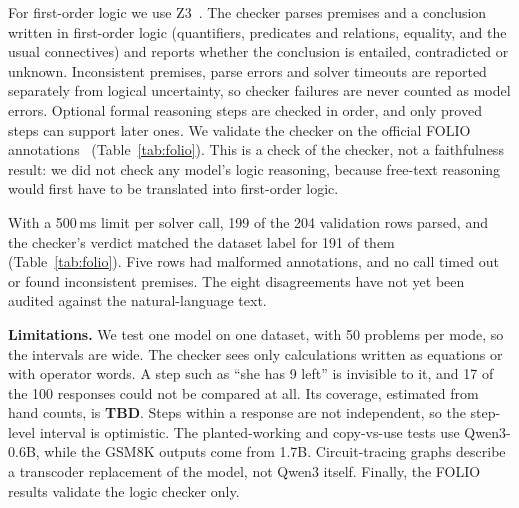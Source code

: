 For first-order logic we use Z3~\cite{demoura2008}. The checker parses premises and a
conclusion written in first-order logic (quantifiers, predicates and relations,
equality, and the usual connectives) and reports whether the conclusion is entailed,
contradicted or unknown. Inconsistent premises, parse errors and solver timeouts are
reported separately from logical uncertainty, so checker failures are never counted
as model errors. Optional formal reasoning steps are checked in order, and only proved
steps can support later ones. We validate the checker on the official FOLIO
annotations~\cite{han2024folio} (Table~\ref{tab:folio}). This is a check of the
checker, not a faithfulness result: we did not check any model's logic reasoning,
because free-text reasoning would first have to be translated into first-order logic.

With a 500\,ms limit per solver call, 199 of the 204 validation rows parsed, and the
checker's verdict matched the dataset label for 191 of them (Table~\ref{tab:folio}).
Five rows had malformed annotations, and no call timed out or found inconsistent
premises. The eight disagreements have not yet been audited against the
natural-language text.

\textbf{Limitations.} We test one model on one dataset, with 50 problems per mode, so
the intervals are wide. The checker sees only calculations written as equations or
with operator words. A step such as ``she has 9 left'' is invisible to it, and 17 of
the 100 responses could not be compared at all. Its coverage, estimated from hand
counts, is \textbf{TBD}. Steps within a response are not independent, so the
step-level interval is optimistic. The planted-working and copy-vs-use tests use
Qwen3-0.6B, while the GSM8K outputs come from 1.7B. Circuit-tracing graphs describe a
transcoder replacement of the model, not Qwen3 itself. Finally, the FOLIO results
validate the logic checker only.

